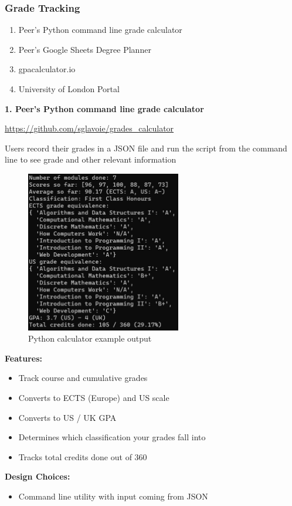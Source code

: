 \documentclass{article}
\begin{document}
\subsubsection{Grade Tracking}
\begin{enumerate}
  \item Peer's Python command line grade calculator
  \item Peer's Google Sheets Degree Planner
  \item gpacalculator.io
  \item University of London Portal
\end{enumerate}
\textbf{1. Peer's Python command line grade calculator}

\noindent \url{https://github.com/sglavoie/grades_calculator}
\bigskip

\noindent Users record their grades in a JSON file and run the script from the command line to see grade and other relevant information
\bigskip

\begin{figure}[h]
\noindent \includegraphics[height=200pt]{py-example-output}
\centering
\caption{Python calculator example output}
\label{fig: py-calc}
\end{figure}

\noindent \textbf{Features:}
\begin{itemize}
\item Track course and cumulative grades
\item Converts to ECTS (Europe) and US scale
\item Converts to US / UK GPA
\item Determines which classification your grades fall into
\item Tracks total credits done out of 360
\end{itemize}
\medskip

\noindent \textbf{Design Choices:}
\begin{itemize}
\item Command line utility with input coming from JSON
\end{itemize}
\medskip
\end{document}
